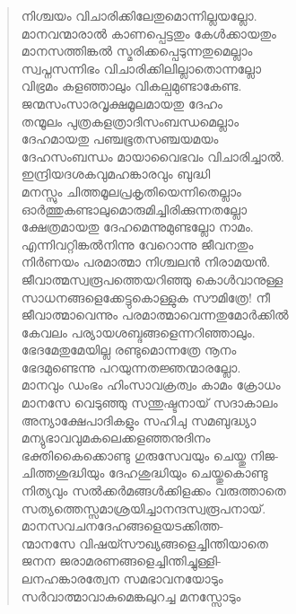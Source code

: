 \begin{verse}
നിശ്ചയം വിചാരിക്കിലേതുമൊന്നില്ലയല്ലോ.\\
മാനവന്മാരാല്‍ കാണപ്പെട്ടതും കേള്‍ക്കായതും\\
മാനസത്തിങ്കല്‍ സ്മരിക്കപ്പെടുന്നതുമെല്ലാം\\
സ്വപ്നസന്നിഭം വിചാരിക്കിലില്ലാതൊന്നല്ലോ\\
വിഭ്രമം കളഞ്ഞാലും വികല്പമുണ്ടാകേണ്ട.\\
ജന്മസംസാരവൃക്ഷമൂലമായതു ദേഹം\\
തന്മൂലം പുത്രകളത്രാദിസംബന്ധമെല്ലാം\\
ദേഹമായതു പഞ്ചഭൂതസഞ്ചയമയം\\
ദേഹസംബന്ധം മായാവൈഭവം വിചാരിച്ചാല്‍.\\
ഇന്ദ്രിയദശകവുമഹങ്കാരവും ബുദ്ധി\\
മനസ്സും ചിത്തമൂലപ്രകൃതിയെന്നിതെല്ലാം\\
ഓര്‍ത്തുകണ്ടാലുമൊരുമിച്ചിരിക്കുന്നതല്ലോ\\
ക്ഷേത്രമായതു ദേഹമെന്നുമുണ്ടല്ലോ നാമം.\\
എന്നിവറ്റിങ്കല്‍നിന്നു വേറൊന്നു ജീവനതും\\
നിര്‍ണയം പരമാത്മാ നിശ്ചലന്‍ നിരാമയന്‍.\\
ജീവാത്മസ്വരൂപത്തെയറിഞ്ഞു കൊള്‍വാനുള്ള\\
സാധനങ്ങളെക്കേട്ടുകൊള്ളുക സൗമിത്രേ! നീ\\
ജീവാത്മാവെന്നും പരമാത്മാവെന്നതുമോര്‍ക്കില്‍\\
കേവലം പര്യായശബ്ദങ്ങളെന്നറിഞ്ഞാലും.\\
ഭേദമേതുമേയില്ല രണ്ടുമൊന്നത്രേ നൂനം\\
ഭേദമുണ്ടെന്നു പറയുന്നതജ്ഞന്മാരല്ലോ.\\
മാനവും ഡംഭം ഹിംസാവക്രത്വം കാമം ക്രോധം\\
മാനസേ വെടുഞ്ഞു സന്തുഷ്ടനായ് സദാകാലം\\
അന്യാക്ഷേപാദികളും സഹിചു സമബുദ്ധ്യാ\\
മന്യുഭാവവുമകലെക്കളഞ്ഞനുദിനം\\
ഭക്തികൈക്കൊണ്ടു ഗുരുസേവയും ചെയ്തു നിജ-\\
ചിത്തശുദ്ധിയും ദേഹശുദ്ധിയും ചെയ്തുകൊണ്ടു\\
നിത്യവും സല്‍ക്കര്‍മങ്ങള്‍ക്കിളക്കം വരുത്താതെ\\
സത്യത്തെസ്സമാശ്രയിച്ചാനന്ദസ്വരൂപനായ്.\\
മാനസവചനദേഹങ്ങളെയടക്കിത്ത-\\
ന്മാനസേ വിഷയ്സൗഖ്യങ്ങളെച്ചിന്തിയാതെ\\
ജനന ജരാമരണങ്ങളെച്ചിന്തിച്ചുള്ളി-\\
ലനഹങ്കാരത്വേന സമഭാവനയോടും\\
സര്‍വാത്മാവാകുമെങ്കലുറച്ച മനസ്സോടും\\

\end{verse}
